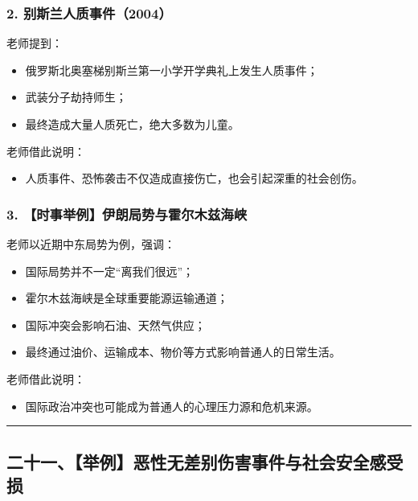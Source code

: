 \documentclass[
  chinese,
  9pt,
  a4paper,
]{ctexart}
\providecommand{\tightlist}{%
  \setlength{\itemsep}{0pt}\setlength{\parskip}{0pt}}
\begin{document}
\subsubsection{2.
别斯兰人质事件（2004）}\label{ux522bux65afux5170ux4ebaux8d28ux4e8bux4ef62004}

老师提到：

\begin{itemize}
\tightlist
\item
  俄罗斯北奥塞梯别斯兰第一小学开学典礼上发生人质事件；
\item
  武装分子劫持师生；
\item
  最终造成大量人质死亡，绝大多数为儿童。
\end{itemize}

老师借此说明：

\begin{itemize}
\tightlist
\item
  人质事件、恐怖袭击不仅造成直接伤亡，也会引起深重的社会创伤。
\end{itemize}

\subsubsection{3.
【时事举例】伊朗局势与霍尔木兹海峡}\label{ux65f6ux4e8bux4e3eux4f8bux4f0aux6717ux5c40ux52bfux4e0eux970dux5c14ux6728ux5179ux6d77ux5ce1}

老师以近期中东局势为例，强调：

\begin{itemize}
\tightlist
\item
  国际局势并不一定``离我们很远''；
\item
  霍尔木兹海峡是全球重要能源运输通道；
\item
  国际冲突会影响石油、天然气供应；
\item
  最终通过油价、运输成本、物价等方式影响普通人的日常生活。
\end{itemize}

老师借此说明：

\begin{itemize}
\tightlist
\item
  国际政治冲突也可能成为普通人的心理压力源和危机来源。
\end{itemize}

\begin{center}\rule{0.5\linewidth}{0.5pt}\end{center}

\subsection{二十一、【举例】恶性无差别伤害事件与社会安全感受损}\label{ux4e8cux5341ux4e00ux4e3eux4f8bux6076ux6027ux65e0ux5deeux522bux4f24ux5bb3ux4e8bux4ef6ux4e0eux793eux4f1aux5b89ux5168ux611fux53d7ux635f}
\end{document}

